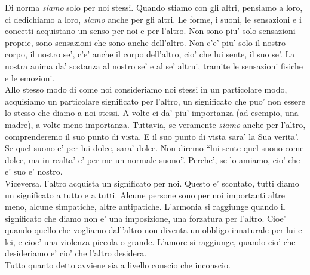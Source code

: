Di norma \emph{siamo} solo per noi stessi. Quando stiamo con gli altri, pensiamo a loro, ci dedichiamo a loro, \emph{siamo} anche per gli altri. Le forme, i suoni, le sensazioni e i concetti acquistano un senso per noi e per l'altro. Non sono piu' solo sensazioni proprie, sono sensazioni che sono anche dell'altro. Non c'e' piu' solo il nostro corpo, il nostro se', c'e' anche il corpo dell'altro, cio' che lui sente, il suo se'. La nostra anima da' sostanza al nostro se' e al se' altrui, tramite le sensazioni fisiche e le emozioni. \\
Allo stesso modo di come noi consideriamo noi stessi in un particolare modo, acquisiamo un particolare significato per l'altro, un significato che puo' non essere lo stesso che diamo a noi stessi. A volte ci da' piu' importanza (ad esempio, una madre), a volte meno importanza. Tuttavia, se veramente \emph{siamo} anche per l'altro, comprenderemo il suo punto di vista. E il suo punto di vista sara' la Sua verita'. Se quel suono e' per lui dolce, sara' dolce. Non diremo ``lui sente quel suono come dolce, ma in realta' e' per me un normale suono''. Perche', se lo amiamo, cio' che e' suo e' nostro.\\
Viceversa, l'altro acquista un significato per noi. Questo e' scontato, tutti diamo un significato a tutto e a tutti. Alcune persone sono per noi importanti altre meno, alcune simpatiche, altre antipatiche. L'armonia si raggiunge quando il significato che diamo non e' una imposizione, una forzatura per l'altro. Cioe' quando quello che vogliamo dall'altro non diventa un obbligo innaturale per lui e lei, e cioe' una violenza piccola o grande. L'amore si raggiunge, quando cio' che desideriamo e' cio' che l'altro desidera. \\
Tutto quanto detto avviene sia a livello conscio che inconscio.\\


